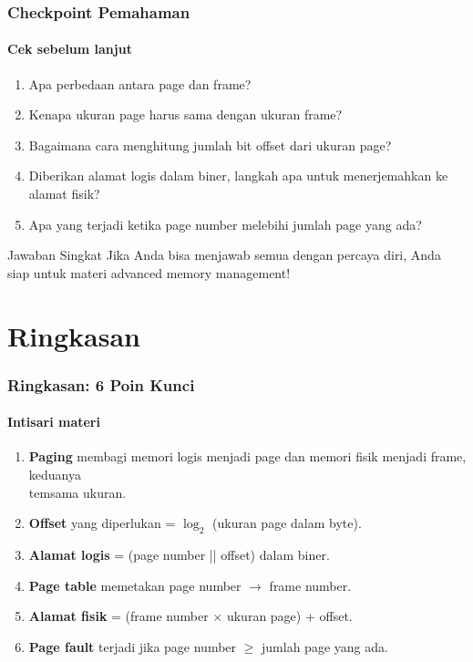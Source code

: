 \documentclass[t,aspectratio=169,xcolor=dvipsnames]{beamer}
\newcommand{\tem}[1]{\textbf{\textcolor{red}{#1}}}
\begin{document}
\begin{frame}
    \frametitle{Checkpoint Pemahaman}
    \framesubtitle{Cek sebelum lanjut}
    \small

    \begin{enumerate}
        \item Apa perbedaan antara page dan frame?
        \item Kenapa ukuran page harus sama dengan ukuran frame?
        \item Bagaimana cara menghitung jumlah bit offset dari ukuran page?
        \item Diberikan alamat logis dalam biner, langkah apa untuk menerjemahkan ke alamat fisik?
        \item Apa yang terjadi ketika page number melebihi jumlah page yang ada?
    \end{enumerate}

    \begin{block}{Jawaban Singkat}
        Jika Anda bisa menjawab semua dengan percaya diri, Anda siap untuk materi advanced memory management!
    \end{block}
\end{frame}

\section{Ringkasan}

\begin{frame}
    \frametitle{Ringkasan: 6 Poin Kunci}
    \framesubtitle{Intisari materi}
    \small

    \begin{enumerate}
        \item \textbf{Paging} membagi memori logis menjadi page dan memori fisik menjadi frame, keduanya \\tem{sama ukuran}.
        \item \textbf{Offset} yang diperlukan = $\log_2$ (ukuran page dalam byte).
        \item \textbf{Alamat logis} = (page number || offset) dalam biner.
        \item \textbf{Page table} memetakan page number $\rightarrow$ frame number.
        \item \textbf{Alamat fisik} = (frame number $\times$ ukuran page) + offset.
        \item \textbf{Page fault} terjadi jika page number $\geq$ jumlah page yang ada.
    \end{enumerate}
\end{frame}
\end{document}
